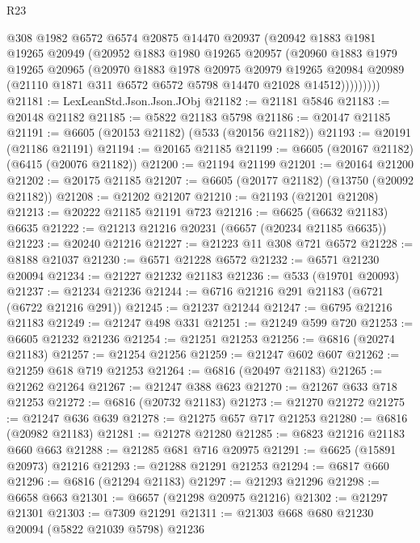 \begin{lexlean}{R23}
\begin{coremodule}
            @308
            @1982
            @6572
            @6574
            @20875
            @14470
            @20937
            (@20942
              @1883
              @1981
              @19265
              @20949
              (@20952
                @1883
                @1980
                @19265
                @20957
                (@20960
                  @1883
                  @1979
                  @19265
                  @20965
                  (@20970
                    @1883
                    @1978
                    @20975
                    @20979
                    @19265
                    @20984
                    @20989
                    (@21110 @1871 @311 @6572 @6572 @5798 @14470 @21028 @14512)))))))))
@21181 := LexLeanStd.Json.Json.JObj
@21182 := @21181 @5846
@21183 := @20148 @21182
@21185 := @5822 @21183 @5798
@21186 := @20147 @21185
@21191 := @6605 (@20153 @21182) (@533 (@20156 @21182))
@21193 := @20191 (@21186 @21191)
@21194 := @20165 @21185
@21199 := @6605 (@20167 @21182) (@6415 (@20076 @21182))
@21200 := @21194 @21199
@21201 := @20164 @21200
@21202 := @20175 @21185
@21207 := @6605 (@20177 @21182) (@13750 (@20092 @21182))
@21208 := @21202 @21207
@21210 := @21193 (@21201 @21208)
@21213 := @20222 @21185 @21191 @723
@21216 := @6625 (@6632 @21183) @6635
@21222 := @21213 @21216 @20231 (@6657 (@20234 @21185 @6635))
@21223 := @20240 @21216
@21227 := @21223 @11 @308 @721 @6572
@21228 := @8188 @21037
@21230 := @6571 @21228 @6572
@21232 := @6571 @21230 @20094
@21234 := @21227 @21232 @21183
@21236 := @533 (@19701 @20093)
@21237 := @21234 @21236
@21244 := @6716 @21216 @291 @21183 (@6721 (@6722 @21216 @291))
@21245 := @21237 @21244
@21247 := @6795 @21216 @21183
@21249 := @21247 @498 @331
@21251 := @21249 @599 @720
@21253 := @6605 @21232 @21236
@21254 := @21251 @21253
@21256 := @6816 (@20274 @21183)
@21257 := @21254 @21256
@21259 := @21247 @602 @607
@21262 := @21259 @618 @719 @21253
@21264 := @6816 (@20497 @21183)
@21265 := @21262 @21264
@21267 := @21247 @388 @623
@21270 := @21267 @633 @718 @21253
@21272 := @6816 (@20732 @21183)
@21273 := @21270 @21272
@21275 := @21247 @636 @639
@21278 := @21275 @657 @717 @21253
@21280 := @6816 (@20982 @21183)
@21281 := @21278 @21280
@21285 := @6823 @21216 @21183 @660 @663
@21288 := @21285 @681 @716 @20975
@21291 := @6625 (@15891 @20973) @21216
@21293 := @21288 @21291 @21253
@21294 := @6817 @660
@21296 := @6816 (@21294 @21183)
@21297 := @21293 @21296
@21298 := @6658 @663
@21301 := @6657 (@21298 @20975 @21216)
@21302 := @21297 @21301
@21303 := @7309 @21291
@21311 := @21303 @668 @680 @21230 @20094 (@5822 @21039 @5798) @21236

\end{coremodule}
\end{lexlean}

